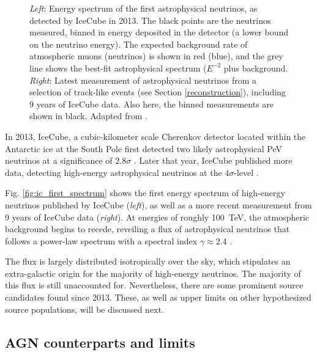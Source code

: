 \documentclass[
    a4paper, %
    fontsize=10pt, %
    twoside=false, %
    numbers=noenddot, %
    fontmethod=tex,
]{kaobook}
\begin{document}
\begin{figure}[htb]
\begin{subfigure}[b]{0.47\textwidth}
    \end{subfigure}
    \caption[Astrophysical neutrino spectrum]{\textit{Left}: Energy spectrum of the first astrophysical neutrinos, as detected by IceCube in 2013. The black points are the neutrinos measured, binned in energy deposited in the detector (a lower bound on the neutrino energy). The expected background rate of atmospheric muons (neutrinos) is shown in red (blue), and the grey line shows the best-fit astrophysical spectrum ($E^{-2}$ plus background. \textit{Right}: Latest measurement of astrophysical neutrinos from a selection of track-like events (see Section \ref{reconstruction}), including 9 years of IceCube data. Also here, the binned measurements are shown in black. Adapted from \cite{Aartsen2013,Abbasi2022b}.}
\end{figure}

In 2013, IceCube, a cubic-kilometer scale Cherenkov detector located within the Antarctic ice at the South Pole first detected two likely astrophysical \unit{\peta\eV} neutrinos at a significance of $2.8\sigma$ . Later that year, IceCube published more data, detecting high-energy astrophysical neutrinos at the $4\sigma$-level .

Fig. \ref{fig:ic_first_spectrum} shows the first energy spectrum of high-energy neutrinos published by IceCube (\textit{left}), as well as a more recent measurement from 9 years of IceCube data (\textit{right}). At energies of roughly \SI{100}{\tera\eV}, the atmospheric background begins to recede, reveiling a flux of astrophysical neutrinos that follows a power-law spectrum with a spectral index $\gamma\approx2.4$ .

The flux is largely distributed isotropically over the sky, which stipulates an extra-galactic origin for the majority of high-energy neutrinos. The majority of this flux is still unaccounted for. Nevertheless, there are some prominent source candidates found since 2013. These, as well as upper limits on other hypothesized source populations, will be discussed next.



\subsection{AGN counterparts and limits}
\end{document}
